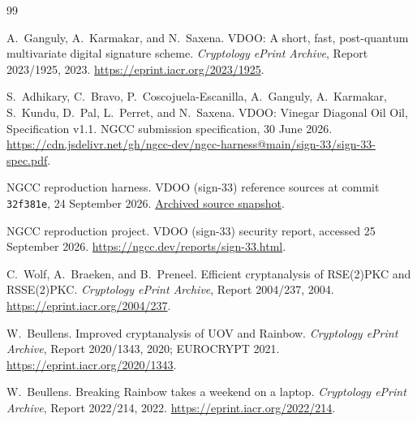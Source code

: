 \documentclass[11pt]{article}
\newcommand{\code}[1]{\texttt{#1}}
\begin{document}
\small\sloppy
\begin{thebibliography}{99}

A.~Ganguly, A.~Karmakar, and N.~Saxena.
\newblock VDOO: A short, fast, post-quantum multivariate digital signature
  scheme.
\newblock \emph{Cryptology ePrint Archive}, Report 2023/1925, 2023.
\newblock \url{https://eprint.iacr.org/2023/1925}.

S.~Adhikary, C.~Bravo, P.~Coscojuela-Escanilla, A.~Ganguly, A.~Karmakar,
S.~Kundu, D.~Pal, L.~Perret, and N.~Saxena.
\newblock VDOO: Vinegar Diagonal Oil Oil, Specification v1.1.
\newblock NGCC submission specification, 30 June 2026.
\newblock \url{https://cdn.jsdelivr.net/gh/ngcc-dev/ngcc-harness@main/sign-33/sign-33-spec.pdf}.

NGCC reproduction harness.
\newblock VDOO (sign-33) reference sources at commit \code{32f381e},
  24 September 2026.
\newblock \href{https://github.com/ngcc-dev/ngcc-harness/tree/32f381e40ae2eb35c83a454e8e59b17f44c26c7d/sign-33}{Archived source snapshot}.

NGCC reproduction project.
\newblock VDOO (sign-33) security report, accessed 25 September 2026.
\newblock \url{https://ngcc.dev/reports/sign-33.html}.

C.~Wolf, A.~Braeken, and B.~Preneel.
\newblock Efficient cryptanalysis of RSE(2)PKC and RSSE(2)PKC.
\newblock \emph{Cryptology ePrint Archive}, Report 2004/237, 2004.
\newblock \url{https://eprint.iacr.org/2004/237}.

W.~Beullens.
\newblock Improved cryptanalysis of UOV and Rainbow.
\newblock \emph{Cryptology ePrint Archive}, Report 2020/1343, 2020;
  EUROCRYPT 2021.
\newblock \url{https://eprint.iacr.org/2020/1343}.

W.~Beullens.
\newblock Breaking Rainbow takes a weekend on a laptop.
\newblock \emph{Cryptology ePrint Archive}, Report 2022/214, 2022.
\newblock \url{https://eprint.iacr.org/2022/214}.

\end{thebibliography}
\end{document}
